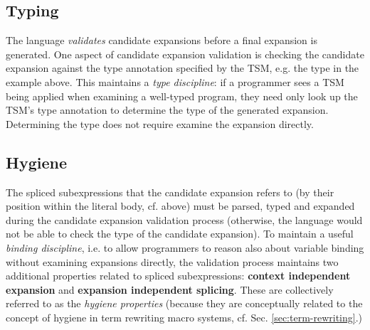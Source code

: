 
\subsection{Typing}\label{sec:uetsms-validation}
The language \emph{validates} candidate expansions before a final expansion is generated. One aspect of candidate expansion validation is checking  the candidate expansion against the type annotation specified by the TSM, e.g. the type  in the example above. This maintains a \emph{type discipline}: if a programmer sees a TSM being applied when examining a well-typed program, they need only look up the TSM's type annotation to determine the type of the generated expansion. Determining the type does not require examine the expansion directly.


\subsection{Hygiene}
The spliced subexpressions that the candidate expansion refers to (by their position within the literal body, cf. above) must be parsed, typed and expanded during the candidate expansion validation process (otherwise, the language would not be able to check the type of the candidate expansion). To maintain a useful \emph{binding discipline}, i.e. to allow programmers to reason also about variable binding without examining expansions directly, the validation process maintains two additional properties related to spliced subexpressions: \textbf{context independent expansion} and \textbf{expansion independent splicing}. These are collectively referred to as the \emph{hygiene properties} (because they are conceptually related to the concept of hygiene in term rewriting macro systems, cf. Sec. \ref{sec:term-rewriting}.) 

